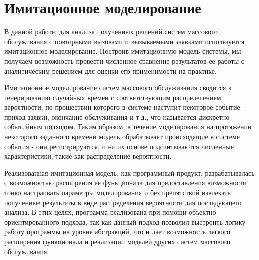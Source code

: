 \section{Имитационное моделирование}
В данной работе, для анализа полученных решений систем массового обслуживания с повторными вызовами и вызываемыми заявками используется имитационное моделирование. Построив имитационную модель системы, мы получаем возможность провести численное сравнение результатов ее работы с аналитическим решением для оценки его применимости на практике.

Имитационное моделирование систем массового обслуживания сводится к генерированию случайных времен с соответствующим распределением вероятности, по прошествии которого в системе наступит некоторое событие - приход заявки, окончание обслуживания и т.д., что называется дискретно-событийным подходом. Таким образом, в течение моделирования на протяжении некоторого заданного времени модель обрабатывает происходящие в системе события - они регистрируются, и на их основе подсчитываются численные характеристики, такие как распределение вероятности.

Реализованная имитационная модель, как программный продукт, разрабатывалась с возможностью расширения ее функционала для предоставления возможности тонко настраивать параметры моделирования и без препятствий извлекать полученные результаты в виде распределения вероятности для последующего анализа. В этих целях, программа реализована при помощи объектно ориентированного подхода, так как данный подход позволил выстроить логику работу программы на уровне абстракций, что и дает возможность легкого расширения функционала и реализации моделей других систем массового обслуживания.

